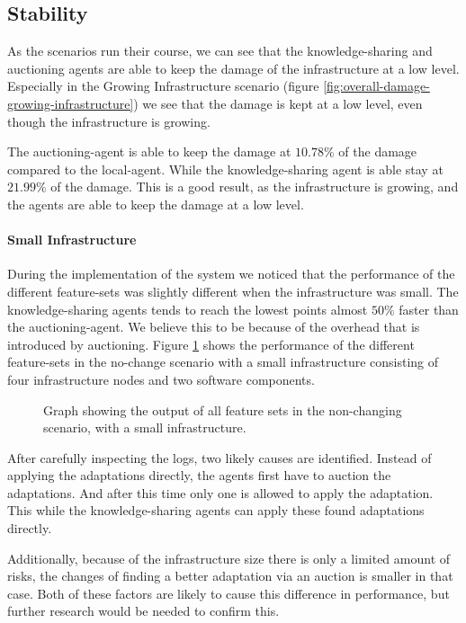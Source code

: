 \subsection{Stability}
\label{ssec:stability}
As the scenarios run their course, we can see that the knowledge-sharing and auctioning agents are able to keep the damage of the infrastructure at a low level. Especially in the Growing Infrastructure scenario (figure \ref{fig:overall-damage-growing-infrastructure}) we see that the damage is kept at a low level, even though the infrastructure is growing. 

The auctioning-agent is able to keep the damage at $10.78\%$ of the damage compared to the local-agent. While the knowledge-sharing agent is able stay at $21.99\%$ of the damage. This is a good result, as the infrastructure is growing, and the agents are able to keep the damage at a low level.

\paragraph*{Small Infrastructure}
During the implementation of the system we noticed that the performance of the different feature-sets was slightly different when the infrastructure was small. The knowledge-sharing agents tends to reach the lowest points almost $50\%$ faster than the auctioning-agent. We believe this to be because of the overhead that is introduced by auctioning. Figure \ref{fig:small-infra-no-change} shows the performance of the different feature-sets in the no-change scenario with a small infrastructure consisting of four infrastructure nodes and two software components.

\begin{figure}[H]
    \centering
        
    \caption{Graph showing the output of all feature sets in the non-changing scenario, with a small infrastructure.}
    \label{fig:small-infra-no-change}
\end{figure}

After carefully inspecting the logs, two likely causes are identified. Instead of applying the adaptations directly, the agents first have to auction the adaptations. And after this time only one is allowed to apply the adaptation. This while the knowledge-sharing agents can apply these found adaptations directly. 

Additionally, because of the infrastructure size there is only a limited amount of risks, the changes of finding a better adaptation via an auction is smaller in that case. Both of these factors are likely to cause this difference in performance, but further research would be needed to confirm this.




